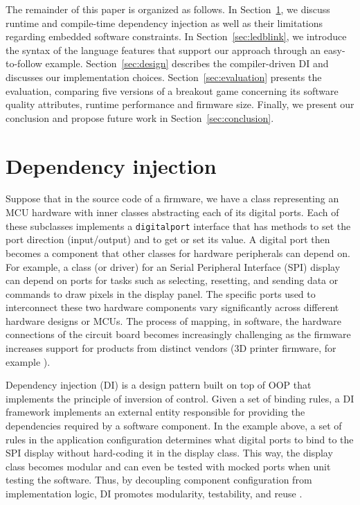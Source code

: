 \documentclass[sigconf]{acmart}
\begin{document}
The remainder of this paper is organized as follows. In Section~\ref{sec:di}, we discuss runtime and compile-time dependency injection as well as their limitations regarding embedded software constraints. In Section~\ref{sec:ledblink}, we introduce the syntax of the language features that support our approach through an easy-to-follow example. Section~\ref{sec:design} describes the compiler-driven DI and discusses our implementation choices. Section~\ref{sec:evaluation} presents the evaluation, comparing five versions of a breakout game concerning its software quality attributes, runtime performance and firmware size. Finally, we present our conclusion and propose future work in Section~\ref{sec:conclusion}.


\section{Dependency injection} \label{sec:di}
 
Suppose that in the source code of a firmware, we have a class representing an MCU hardware with inner classes abstracting each of its digital ports. Each of these subclasses implements a {\tt digitalport} interface that has methods to set the port direction (input/output) and to get or set its value. A digital port then becomes a component that other classes for hardware peripherals can depend on. For example, a class (or driver) for an Serial Peripheral Interface (SPI) display can depend on ports for tasks such as selecting, resetting, and sending data or commands to draw pixels in the display panel. The specific ports used to interconnect these two hardware components vary significantly across different hardware designs or MCUs. The process of mapping, in software, the hardware connections of the circuit board becomes increasingly challenging as the firmware increases support for products from distinct vendors (3D printer firmware, for example \cite{marlinfwm2025}).
 
Dependency injection (DI) \cite{seemann2019dependency} is a design pattern built on top of OOP that implements the principle of inversion of control. Given a set of binding rules, a DI framework implements an external entity responsible for providing the dependencies required by a software component. In the example above, a set of rules in the application configuration determines what digital ports to bind to the SPI display without hard-coding it in the display class. This way, the display class becomes modular and can even be tested with mocked ports when unit testing the software. Thus, by decoupling component configuration from implementation logic, DI promotes modularity, testability, and reuse \cite{seemann2019dependency,garousi2019}.
\end{document}
